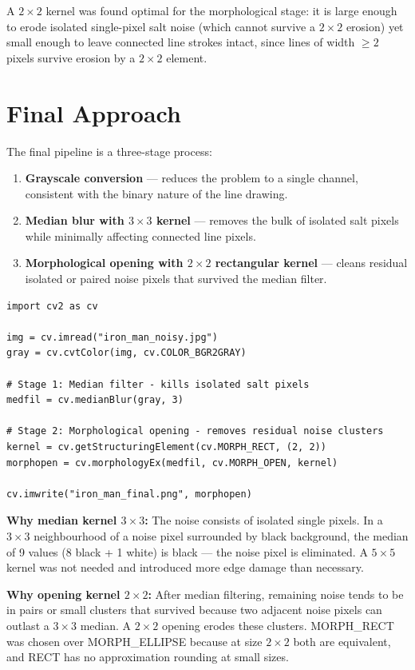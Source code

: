 \documentclass[journal]{IEEEtran}
\begin{document}
A $2\times2$ kernel was found optimal for the morphological stage: it is large enough 
to erode isolated single-pixel salt noise (which cannot survive a $2\times2$ erosion) 
yet small enough to leave connected line strokes intact, since lines of width $\geq2$ 
pixels survive erosion by a $2\times2$ element.

\section{Final Approach}

The final pipeline is a three-stage process:

\begin{enumerate}
    \item \textbf{Grayscale conversion} — reduces the problem to a single channel, 
    consistent with the binary nature of the line drawing.
    \item \textbf{Median blur with $3\times3$ kernel} — removes the bulk of isolated 
    salt pixels while minimally affecting connected line pixels.
    \item \textbf{Morphological opening with $2\times2$ rectangular kernel} — 
    cleans residual isolated or paired noise pixels that survived the median filter.
\end{enumerate}

\begin{lstlisting}
import cv2 as cv

img = cv.imread("iron_man_noisy.jpg")
gray = cv.cvtColor(img, cv.COLOR_BGR2GRAY)

# Stage 1: Median filter - kills isolated salt pixels
medfil = cv.medianBlur(gray, 3)

# Stage 2: Morphological opening - removes residual noise clusters
kernel = cv.getStructuringElement(cv.MORPH_RECT, (2, 2))
morphopen = cv.morphologyEx(medfil, cv.MORPH_OPEN, kernel)

cv.imwrite("iron_man_final.png", morphopen)
\end{lstlisting}

\textbf{Why median kernel $3\times3$:} The noise consists of isolated single pixels. 
In a $3\times3$ neighbourhood of a noise pixel surrounded by black background, 
the median of 9 values (8 black + 1 white) is black — the noise pixel is eliminated. 
A $5\times5$ kernel was not needed and introduced more edge damage than necessary.

\textbf{Why opening kernel $2\times2$:} After median filtering, remaining noise 
tends to be in pairs or small clusters that survived because two adjacent noise pixels 
can outlast a $3\times3$ median. A $2\times2$ opening erodes these clusters. 
MORPH\_RECT was chosen over MORPH\_ELLIPSE because at size $2\times2$ both are 
equivalent, and RECT has no approximation rounding at small sizes.
\end{document}
